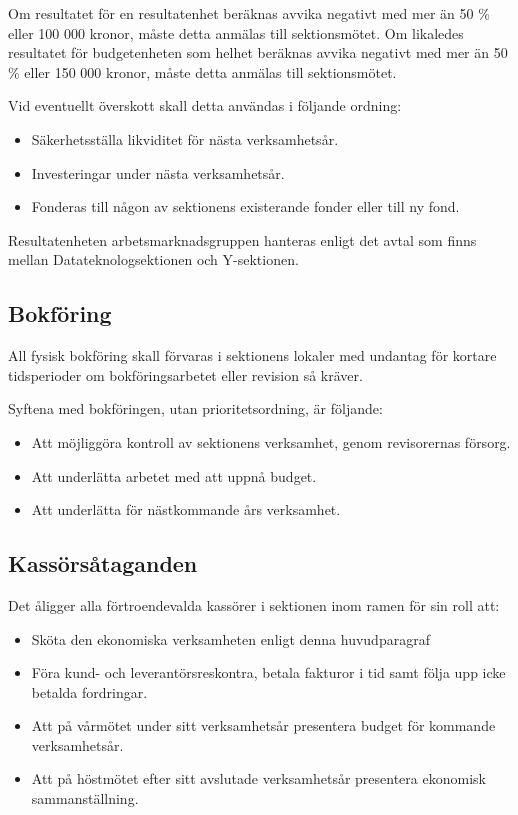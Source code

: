 \documentclass{datateknologsektionen-document}
\begin{document}
Om resultatet för en resultatenhet beräknas avvika negativt med mer än 50 \% eller
100 000 kronor, måste detta anmälas till sektionsmötet. Om likaledes resultatet för
budgetenheten som helhet beräknas avvika negativt med mer än 50 \% eller 150 000 kronor,
måste detta anmälas till sektionsmötet.

Vid eventuellt överskott skall detta användas i följande ordning:
\begin{itemize}
  \item Säkerhetsställa likviditet för nästa verksamhetsår.
  \item Investeringar under nästa verksamhetsår.
  \item Fonderas till någon av sektionens existerande fonder eller till ny fond.
\end{itemize}

Resultatenheten arbetsmarknadsgruppen hanteras enligt det avtal som finns mellan
Datateknologsektionen och Y-sektionen.

\subsection{Bokföring}
All fysisk bokföring skall förvaras i sektionens lokaler med undantag för kortare
tidsperioder om bokföringsarbetet eller revision så kräver.

Syftena med bokföringen, utan prioritetsordning, är följande:
\begin{itemize}
  \item Att möjliggöra kontroll av sektionens verksamhet, genom revisorernas försorg.
  \item Att underlätta arbetet med att uppnå budget.
  \item Att underlätta för nästkommande års verksamhet.
\end{itemize}

\subsection{Kassörsåtaganden}
\label{kassorsataganden}
Det åligger alla förtroendevalda kassörer i sektionen inom ramen för sin roll att:
\begin{itemize}
  \item Sköta den ekonomiska verksamheten enligt denna huvudparagraf
  \item Föra kund- och leverantörsreskontra, betala fakturor i tid samt följa upp icke betalda fordringar.
  \item Att på vårmötet under sitt verksamhetsår presentera budget för kommande verksamhetsår.
  \item Att på höstmötet efter sitt avslutade verksamhetsår presentera ekonomisk sammanställning.
\end{itemize}
\end{document}
